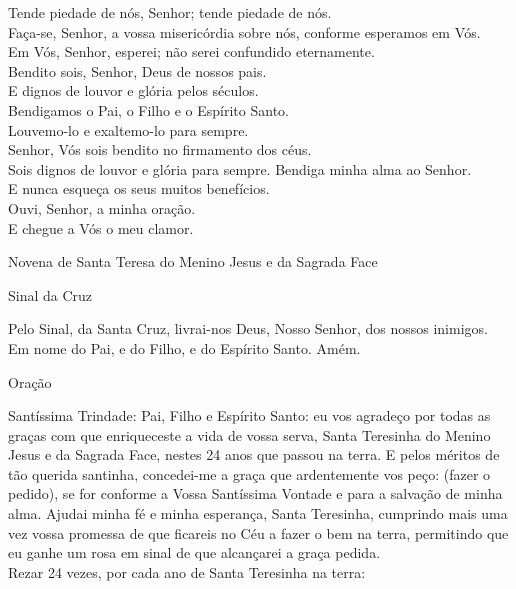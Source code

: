 \documentclass{book}
\begin{document}
\begin{flushleft}
    Tende piedade de nós, Senhor; tende piedade de nós. \\
    Faça-se, Senhor, a vossa misericórdia sobre nós, conforme esperamos em Vós. \\
    Em Vós, Senhor, esperei; não serei confundido eternamente.
    \vspace{.2cm} \\
    \VbarRed{} Bendito sois, Senhor, Deus de nossos pais. \\
    \RbarRed{} E dignos de louvor e glória pelos séculos.
    \vspace{.2cm} \\
    \VbarRed{} Bendigamos o Pai, o Filho e o Espírito Santo. \\
    \RbarRed{} Louvemo-lo e exaltemo-lo para sempre.
    \vspace{.2cm} \\
    \VbarRed{} Senhor, Vós sois bendito no firmamento dos céus. \\
    \RbarRed{} Sois dignos de louvor e glória para sempre.
    \newpage
    \VbarRed{} Bendiga minha alma ao Senhor. \\
    \RbarRed{} E nunca esqueça os seus muitos benefícios.
    \vspace{.2cm} \\
    \VbarRed{} Ouvi, Senhor, a minha oração. \\
    \RbarRed{} E chegue a Vós o meu clamor.
\end{flushleft}
\begin{center}
    Novena de Santa Teresa do Menino Jesus e da Sagrada Face
\end{center}
\begin{center}
    Sinal da Cruz
\end{center}
\begin{flushleft}
    Pelo Sinal, \grecrossRed{} da Santa Cruz, livrai-nos Deus, \grecrossRed{} Nosso Senhor, dos nossos \grecrossRed{} inimigos. Em nome do Pai, \grecrossRed{} e do Filho, e do Espírito Santo. Amém.
\end{flushleft}
\begin{center}
    Oração
\end{center}
\begin{flushleft}
    Santíssima Trindade: Pai, Filho e Espírito Santo: eu vos agradeço por todas as graças com que enriqueceste a vida de vossa serva, Santa Teresinha do Menino Jesus e da Sagrada Face, nestes 24 anos que passou na terra. E pelos méritos de tão querida santinha, concedei-me a graça que ardentemente vos peço: (\textcolor{VioletRed2}{fazer o pedido}), se for conforme a Vossa Santíssima Vontade e para a salvação de minha alma. Ajudai minha fé e minha esperança, Santa Teresinha, cumprindo mais uma vez vossa promessa de que ficareis no Céu a fazer o bem na terra, permitindo que eu ganhe um rosa em sinal de que alcançarei a graça pedida.
    \vspace{.2cm} \\
    Rezar 24 vezes, por cada ano de Santa Teresinha na terra:
\end{flushleft}
\end{document}
